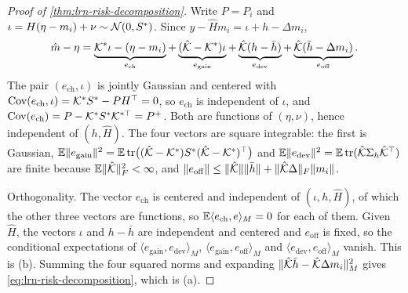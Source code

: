 \begin{proof}[Proof of \cref{thm:lrn-risk-decomposition}]
Write $P=P_i$ and $\iota=H(\eta-m_i)+\nu\sim\mathcal{N}(0,S^\ast)$. Since $y-\hat Hm_i=\iota+h-\Delta m_i$,
\begin{equation}\label{eq:lrn-four-errors}
\hat m-\eta=\underbrace{\mathcal{K}^\ast\iota-(\eta-m_i)}_{e_{\mathrm{ch}}}+\underbrace{(\hat{\mathcal{K}}-\mathcal{K}^\ast)\iota}_{e_{\mathrm{gain}}}+\underbrace{\hat{\mathcal{K}}(h-\bar h)}_{e_{\mathrm{dev}}}+\underbrace{\hat{\mathcal{K}}(\bar h-\Delta m_i)}_{e_{\mathrm{off}}}.
\end{equation}
The pair $(e_{\mathrm{ch}},\iota)$ is jointly Gaussian and centered with $\operatorname{Cov}(e_{\mathrm{ch}},\iota)=\mathcal{K}^\ast S^\ast-PH^\top=0$, so $e_{\mathrm{ch}}$ is independent of $\iota$, and $\operatorname{Cov}(e_{\mathrm{ch}})=P-\mathcal{K}^\ast S^\ast\mathcal{K}^{\ast\top}=P^+$. Both are functions of $(\eta,\nu)$, hence independent of $(h,\hat H)$. The four vectors are square integrable: the first is Gaussian, $\mathbb{E}\Vert e_{\mathrm{gain}}\Vert^2=\mathbb{E}\operatorname{tr}\bigl((\hat{\mathcal{K}}-\mathcal{K}^\ast)S^\ast(\hat{\mathcal{K}}-\mathcal{K}^\ast)^\top\bigr)$ and $\mathbb{E}\Vert e_{\mathrm{dev}}\Vert^2=\mathbb{E}\operatorname{tr}(\hat{\mathcal{K}}\Sigma_h\hat{\mathcal{K}}^\top)$ are finite because $\mathbb{E}\Vert\hat{\mathcal{K}}\Vert_F^2<\infty$, and $\Vert e_{\mathrm{off}}\Vert\le\Vert\hat{\mathcal{K}}\Vert\Vert\bar h\Vert+\Vert\hat{\mathcal{K}}\Delta\Vert_F\Vert m_i\Vert$.

Orthogonality. The vector $e_{\mathrm{ch}}$ is centered and independent of $(\iota,h,\hat H)$, of which the other three vectors are functions, so $\mathbb{E}\langle e_{\mathrm{ch}},e\rangle_M=0$ for each of them. Given $\hat H$, the vectors $\iota$ and $h-\bar h$ are independent and centered and $e_{\mathrm{off}}$ is fixed, so the conditional expectations of $\langle e_{\mathrm{gain}},e_{\mathrm{dev}}\rangle_M$, $\langle e_{\mathrm{gain}},e_{\mathrm{off}}\rangle_M$ and $\langle e_{\mathrm{dev}},e_{\mathrm{off}}\rangle_M$ vanish. This is (b). Summing the four squared norms and expanding $\Vert\hat{\mathcal{K}}\bar h-\hat{\mathcal{K}}\Delta m_i\Vert_M^2$ gives \cref{eq:lrn-risk-decomposition}, which is (a).


\end{proof}

